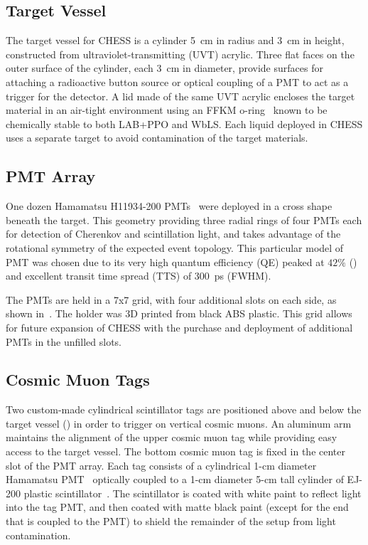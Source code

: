 \subsection{Target Vessel}
The target vessel for CHESS is a cylinder 5~cm in radius and 3~cm in height, constructed from ultraviolet-transmitting (UVT) acrylic. 
Three flat faces on the outer surface of the cylinder, each 3~cm in diameter, provide surfaces for attaching a radioactive button source or optical coupling of a PMT to act as a trigger for the detector. 
A lid made of the same UVT acrylic encloses the target material in an air-tight environment using an FFKM o-ring~\cite{cog-oring} known to be chemically stable to both LAB+PPO and WbLS. 
Each liquid deployed in CHESS uses a separate target to avoid contamination of the target materials.

\subsection{PMT Array}

\label{pmtarray}
One dozen Hamamatsu H11934-200 PMTs~\cite{h11934} were deployed in a cross shape beneath the target.
This geometry providing three radial rings of four PMTs each for detection of Cherenkov and scintillation light, and takes advantage of the rotational symmetry of the expected event topology. 
This particular model of PMT was chosen due to its very high quantum efficiency (QE) peaked at $42\%$ () and excellent transit time spread (TTS) of 300~ps (FWHM).

The PMTs are held in a 7x7 grid, with four additional slots on each side, as shown in~. 
The holder was 3D printed from black ABS plastic.
This grid allows for future expansion of CHESS with the purchase and deployment of additional PMTs in the unfilled slots.

\subsection{Cosmic Muon Tags}

Two custom-made cylindrical scintillator tags are positioned above and below the target vessel () in order to trigger on vertical cosmic muons.  
An aluminum arm maintains the alignment of the upper cosmic muon tag while providing easy access to the target vessel.
The bottom cosmic muon tag is fixed in the center slot of the PMT array. 
Each tag consists of a cylindrical 1-cm diameter Hamamatsu PMT~\cite{h3164} optically coupled to a 1-cm diameter 5-cm tall cylinder of EJ-200 plastic scintillator~\cite{ej200}.
The scintillator is coated with white paint to reflect light into the tag PMT, and then coated with matte black paint (except for the end that is coupled to the PMT) to shield the remainder of the setup from light contamination. 

